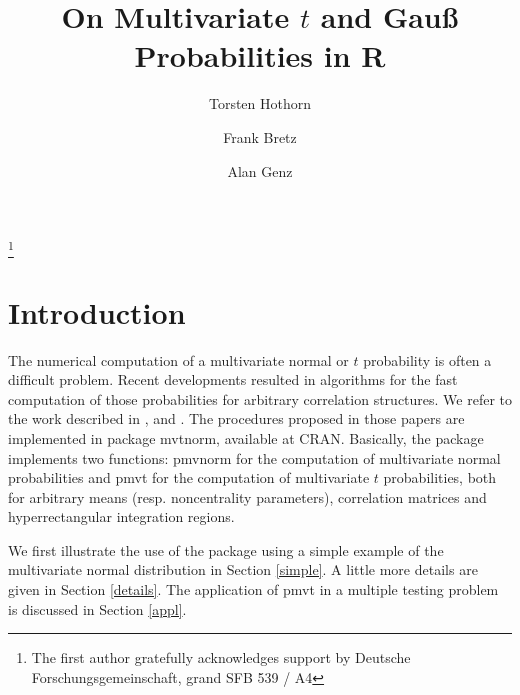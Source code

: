 \documentclass[11pt]{amsart}
\begin{document}
\title{On Multivariate $t$ and Gau{\ss} Probabilities in R}

\author{Torsten Hothorn}
\thanks{The first author gratefully acknowledges support by Deutsche
Forschungsgemeinschaft, grand SFB 539 / A4}
\address{Friedrich-Alexander-Universit\"at Erlangen-N\"urnberg \\
Institut f\"ur Medizininformatik, Biometrie und Epidemiologie \\
Waldstra{\ss}e 6, D-91054 Erlangen}
\author{Frank Bretz}
\address{Universit\"at Hannover \\ LG Bioinformatik, FB Gartenbau \\
Herrenh\"auser Str. 2 \\ D-30419 Hannover}
\author{Alan Genz}
\address{Department of Mathematics \\ Washington State University \\
Pullman, WA 99164-3113 USA}

\maketitle

\section*{Introduction}

The numerical computation of a multivariate normal or $t$
probability is often a difficult problem. Recent developments
resulted in algorithms for the fast computation of those
probabilities for arbitrary correlation structures. We refer to
the work described in \cite{numerical-:1992},
\cite{comparison:1993} and \cite{numerical-:1999}. The procedures
proposed in those papers are implemented in package {\ttfamily
mvtnorm}, available at CRAN. Basically, the package implements
two functions: {\ttfamily pmvnorm} for the computation of
multivariate normal probabilities and {\ttfamily pmvt} for the
computation of multivariate $t$ probabilities, both for arbitrary
means (resp. noncentrality parameters), correlation matrices and
hyperrectangular integration regions.

We first illustrate the use of the package using a simple example of the
multivariate normal distribution in Section \ref{simple}.
A little more details are given in Section \ref{details}. The application of
{\ttfamily pmvt} in a multiple testing problem is discussed in Section
\ref{appl}.
\end{document}
